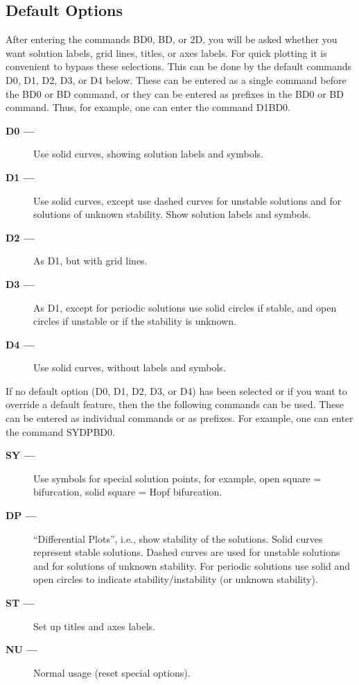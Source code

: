 \subsection{Default Options}

After entering the commands BD0, BD, or 2D, you will be asked whether you 
want solution labels, grid lines, titles, or axes labels.
For quick plotting it is convenient to bypass these selections.
This can be done by the default commands D0, D1, D2, D3, or D4 below.
These can be entered as a single command before the BD0 or BD command,
or they can be entered as prefixes in the BD0 or BD command. 
Thus, for example, one can enter the command D1BD0.  

\begin{description}
\item[\bf D0 ---]  Use solid curves, showing solution labels and symbols.    
\item[\bf D1 ---]  Use solid curves, except use dashed curves for unstable
                   solutions and for solutions of unknown stability.
                   Show solution labels and symbols.
\item[\bf D2 ---]  As D1, but with grid lines.   
\item[\bf D3 ---]  As D1, except for periodic solutions use 
                   solid circles if stable,
                   and open circles if unstable or if the stability
                   is unknown.
\item[\bf D4 ---]  Use solid curves, without labels and symbols.  
\end{description}

If no default option (D0, D1, D2, D3, or D4) has been selected 
or if you want to override a default feature,
then the the following commands can be used.
These can be entered as individual commands or as prefixes.
For example, one can enter the command SYDPBD0.

\begin{description}     
\item[\bf SY ---]    Use symbols for special solution points, for example,
                     open square = bifurcation,
                     solid square = Hopf bifurcation.
\item[\bf DP ---]    ``Differential Plots'', i.e., show stability of the 
                     solutions. Solid curves represent stable solutions.
                     Dashed curves are used for unstable
                     solutions and for solutions of unknown stability.
                     For periodic solutions use solid and open circles
                     to indicate stability/instability (or unknown
                     stability).
\item[\bf ST ---]    Set up titles and axes labels. 
\item[\bf NU ---]    Normal usage (reset special options). 
\end{description}


